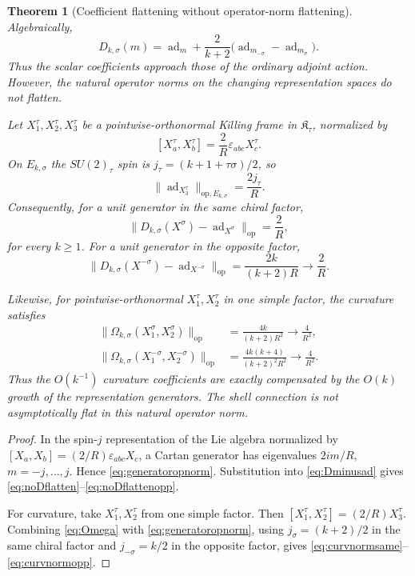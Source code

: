 \documentclass[
 aps,
 prd,
 reprint,
 amsmath,
 amssymb,
 nofootinbib,
 superscriptaddress
]{revtex4-2}
\newtheorem{theorem}{Theorem}[section]
\theoremstyle{definition}
\theoremstyle{remark}
\newcommand{\cK}{\mathfrak K}
\newcommand{\ad}{\operatorname{ad}}
\begin{document}
\begin{theorem}[Coefficient flattening without operator-norm flattening]
\label{thm:noUVflattening}
Algebraically,
\begin{equation}
 D_{k,\sigma}(m)
 =
 \ad_m+
 \frac{2}{k+2}
 \bigl(\ad_{m_{-\sigma}}-\ad_{m_\sigma}\bigr).
 \label{eq:Dminusad}
\end{equation}
Thus the scalar coefficients approach those of the ordinary adjoint action.
However, the natural operator norms on the changing representation spaces
do not flatten.

Let $X_1^\tau,X_2^\tau,X_3^\tau$ be a pointwise-orthonormal Killing frame
in $\cK_\tau$, normalized by
\[
 [X_a^\tau,X_b^\tau]=\frac{2}{R}\varepsilon_{abc}X_c^\tau .
\]
On $E_{k,\sigma}$ the $SU(2)_\tau$ spin is
$j_\tau=(k+1+\tau\sigma)/2$, so
\begin{equation}
 \|\ad_{X_3^\tau}\|_{\mathrm{op},E_{k,\sigma}}
 =
 \frac{2j_\tau}{R}.
 \label{eq:generatoropnorm}
\end{equation}
Consequently, for a unit generator in the same chiral factor,
\begin{equation}
 \boxed{
 \|D_{k,\sigma}(X^\sigma)-\ad_{X^\sigma}\|_{\mathrm{op}}
 =
 \frac{2}{R},
 }
 \label{eq:noDflatten}
\end{equation}
for every $k\ge1$.  For a unit generator in the opposite factor,
\begin{equation}
 \|D_{k,\sigma}(X^{-\sigma})-\ad_{X^{-\sigma}}\|_{\mathrm{op}}
 =
 \frac{2k}{(k+2)R}
 \longrightarrow \frac{2}{R}.
 \label{eq:noDflattenopp}
\end{equation}

Likewise, for pointwise-orthonormal
$X_1^\tau,X_2^\tau$ in one simple factor, the curvature satisfies
\begin{align}
 \|\Omega_{k,\sigma}(X_1^\sigma,X_2^\sigma)\|_{\mathrm{op}}
 &=
 \frac{4k}{(k+2)R^2}
 \longrightarrow \frac{4}{R^2},
 \label{eq:curvnormsame}\\
 \|\Omega_{k,\sigma}(X_1^{-\sigma},X_2^{-\sigma})\|_{\mathrm{op}}
 &=
 \frac{4k(k+4)}{(k+2)^2R^2}
 \longrightarrow \frac{4}{R^2}.
 \label{eq:curvnormopp}
\end{align}
Thus the $O(k^{-1})$ curvature coefficients are exactly compensated by the
$O(k)$ growth of the representation generators.  The shell connection is
not asymptotically flat in this natural operator norm.
\end{theorem}

\begin{proof}
In the spin-$j$ representation of the Lie algebra normalized by
$[X_a,X_b]=(2/R)\varepsilon_{abc}X_c$, a Cartan generator has eigenvalues
$2im/R$, $m=-j,\ldots,j$.  Hence
\eqref{eq:generatoropnorm}.  Substitution into \eqref{eq:Dminusad} gives
\eqref{eq:noDflatten}--\eqref{eq:noDflattenopp}.

For curvature, take $X_1^\tau,X_2^\tau$ from one simple factor.  Then
$[X_1^\tau,X_2^\tau]=(2/R)X_3^\tau$.  Combining
\eqref{eq:Omega} with \eqref{eq:generatoropnorm}, using
$j_\sigma=(k+2)/2$ in the same chiral factor and
$j_{-\sigma}=k/2$ in the opposite factor, gives
\eqref{eq:curvnormsame}--\eqref{eq:curvnormopp}.
\end{proof}
\end{document}
